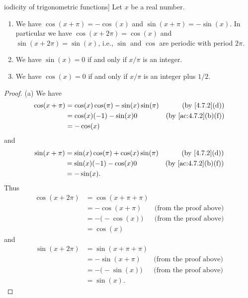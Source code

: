 \begin{thm}iodicity of trigonometric functions]\label{4.7.5}
  Let \(x\) be a real number.
  \begin{enumerate}
    \item We have \(\cos(x + \pi) = -\cos(x)\) and \(\sin(x + \pi) = -\sin(x)\).
          In particular we have \(\cos(x + 2\pi) = \cos(x)\) and \(\sin(x + 2\pi) = \sin(x)\), i.e., \(\sin\) and \(\cos\) are periodic with period \(2\pi\).
    \item We have \(\sin(x) = 0\) if and only if \(x / \pi\) is an integer.
    \item We have \(\cos(x) = 0\) if and only if \(x / \pi\) is an integer plus \(1 / 2\).
  \end{enumerate}
\end{thm}

\begin{proof}{(a)}
  We have
  \begin{align*}
    \cos(x + \pi) & = \cos(x) \cos(\pi) - \sin(x) \sin(\pi) & \text{(by \cref{4.7.2}(d))}       \\
                  & = \cos(x) (-1) - \sin(x) 0              & \text{(by \cref{ac:4.7.2}(b)(f))} \\
                  & = -\cos(x)
  \end{align*}
  and
  \begin{align*}
    \sin(x + \pi) & = \sin(x) \cos(\pi) + \cos(x) \sin(\pi) & \text{(by \cref{4.7.2}(d))}       \\
                  & = \sin(x) (-1) - \cos(x) 0              & \text{(by \cref{ac:4.7.2}(b)(f))} \\
                  & = -\sin(x).
  \end{align*}
  Thus
  \begin{align*}
    \cos(x + 2\pi) & = \cos(x + \pi + \pi)                                 \\
                   & = -\cos(x + \pi)      & \text{(from the proof above)} \\
                   & = -\big(-\cos(x)\big) & \text{(from the proof above)} \\
                   & = \cos(x)
  \end{align*}
  and
  \begin{align*}
    \sin(x + 2\pi) & = \sin(x + \pi + \pi)                                 \\
                   & = -\sin(x + \pi)      & \text{(from the proof above)} \\
                   & = -\big(-\sin(x)\big) & \text{(from the proof above)} \\
                   & = \sin(x).
  \end{align*}
\end{proof}

